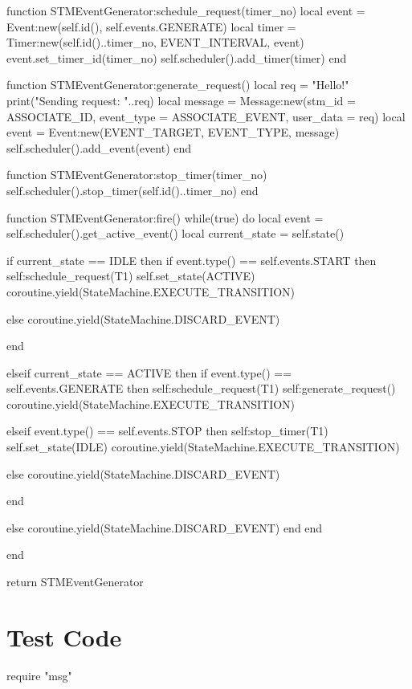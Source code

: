 \begin{appendices}
\begin{listing}[htp]
\begin{luacode}
function STMEventGenerator:schedule_request(timer_no)
	local event = Event:new(self.id(), self.events.GENERATE)
	local timer = Timer:new(self.id()..timer_no, EVENT_INTERVAL, event)
	event.set_timer_id(timer_no)
	self.scheduler().add_timer(timer)
end

function STMEventGenerator:generate_request()
	local req = "Hello!"
	print("Sending request: "..req)
	local message = Message:new({stm_id = ASSOCIATE_ID, event_type = ASSOCIATE_EVENT, user_data = req})
	local event = Event:new(EVENT_TARGET, EVENT_TYPE, message)
	self.scheduler().add_event(event)
end

function STMEventGenerator:stop_timer(timer_no)
	self.scheduler().stop_timer(self.id()..timer_no)
end

function STMEventGenerator:fire()
	while(true) do
		local event = self.scheduler().get_active_event()
		local current_state = self.state()

		if current_state == IDLE then
			if event.type() == self.events.START then
				self:schedule_request(T1)
				self.set_state(ACTIVE)
				coroutine.yield(StateMachine.EXECUTE_TRANSITION)
			
			else
				coroutine.yield(StateMachine.DISCARD_EVENT)
				
			end

		elseif current_state == ACTIVE then
			if event.type() == self.events.GENERATE then
				self:schedule_request(T1)
				self:generate_request()
				coroutine.yield(StateMachine.EXECUTE_TRANSITION)
			
			elseif event.type() == self.events.STOP then
				self:stop_timer(T1)
				self.set_state(IDLE)
				coroutine.yield(StateMachine.EXECUTE_TRANSITION)
			
			else
				coroutine.yield(StateMachine.DISCARD_EVENT)

			end

		else
			coroutine.yield(StateMachine.DISCARD_EVENT)
		end
	end

end

return STMEventGenerator
\end{luacode}
\end{listing}

\FloatBarrier
\section{Test Code}

\begin{listing}[htp]
\begin{luacode}
require "msg"


\end{luacode}
\end{listing}
\end{appendices}
